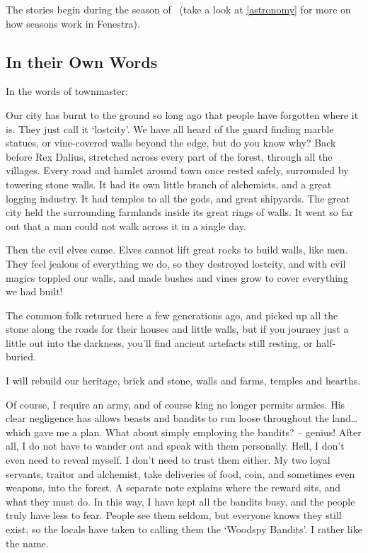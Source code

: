 \begin{multicols}{2}
The stories begin during the season of \season\ (take a look at \autoref{astronomy} for more on how seasons work in Fenestra).

\subsection{In their Own Words}
\label{expanding_wilderness}

In the words of \gls{townmaster}:

\begin{exampletext}

  Our city has burnt to the ground so long ago that people have forgotten where it is.
  They just call it `\gls{lostcity}'.
  We have all heard of the \gls{guard} finding marble statues, or vine-covered walls beyond the \gls{edge}, but do you know why?
  Back before Rex Dalius,  stretched across every part of the forest, through all the villages.
  Every road and hamlet around \gls{town} once rested safely, surrounded by towering stone walls.
  It had its own little branch of \gls{alchemists}, and a great logging industry.
  It had temples to all the gods, and great shipyards.
  The great city held the surrounding farmlands inside its great rings of walls.
  It went so far out that a man could not walk across it in a single day.

  Then the evil elves came.
  Elves cannot lift great rocks to build walls, like men.
  They feel jealous of everything we do, so they destroyed \gls{lostcity}, and with evil magics toppled our walls, and made bushes and vines grow to cover everything we had built!

  The common folk returned here a few generations ago, and picked up all the stone along the roads for their houses and little walls, but if you journey just a little out into the darkness, you'll find ancient artefacts still resting, or half-buried.

  I will rebuild our heritage, brick and stone, walls and farms, temples and hearths.

  Of course, I require an army, and of course \gls{king} no longer permits armies.
  His clear negligence has allows beasts and bandits to run loose throughout the land\ldots which gave me a plan.
  What about simply employing the bandits? -- genius!
  After all, I do not have to wander out and speak with them personally.
  Hell, I don't even need to reveal myself.
  I don't need to trust them either.
  My two loyal servants, \gls{traitor} and \gls{alchemist}, take deliveries of food, coin, and sometimes even weapons, into the forest.
  A separate note explains where the reward sits, and what they must do.
  In this way, I have kept all the bandits busy, and the people truly have less to fear.
  People see them seldom, but everyone knows they still exist, so the locals have taken to calling them the `Woodspy Bandits'.
  I rather like the name.


\end{exampletext}
\end{multicols}
